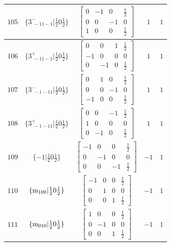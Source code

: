 \documentclass[fleqn,8pt]{jsarticle}
\begin{document}
\begin{longtable}{ccccc}
$ 105 $ & $ \{3^{-}_{\,\,-11-1}|\frac{1}{2} 0 \frac{1}{2}\} $ & $ \begin{bmatrix} 0 & -1 & 0 & \frac{1}{2} \\ 0 & 0 & -1 & 0 \\ 1 & 0 & 0 & \frac{1}{2} \end{bmatrix} $ & $ 1 $ & $ 1 $ \\ \hline
$ 106 $ & $ \{3^{+}_{\,\,-11-1}|\frac{1}{2} 0 \frac{1}{2}\} $ & $ \begin{bmatrix} 0 & 0 & 1 & \frac{1}{2} \\ -1 & 0 & 0 & 0 \\ 0 & -1 & 0 & \frac{1}{2} \end{bmatrix} $ & $ 1 $ & $ 1 $ \\ \hline
$ 107 $ & $ \{3^{-}_{\,\,-1-11}|\frac{1}{2} 0 \frac{1}{2}\} $ & $ \begin{bmatrix} 0 & 1 & 0 & \frac{1}{2} \\ 0 & 0 & -1 & 0 \\ -1 & 0 & 0 & \frac{1}{2} \end{bmatrix} $ & $ 1 $ & $ 1 $ \\ \hline
$ 108 $ & $ \{3^{+}_{\,\,-1-11}|\frac{1}{2} 0 \frac{1}{2}\} $ & $ \begin{bmatrix} 0 & 0 & -1 & \frac{1}{2} \\ 1 & 0 & 0 & 0 \\ 0 & -1 & 0 & \frac{1}{2} \end{bmatrix} $ & $ 1 $ & $ 1 $ \\ \hline
$ 109 $ & $ \{-1|\frac{1}{2} 0 \frac{1}{2}\} $ & $ \begin{bmatrix} -1 & 0 & 0 & \frac{1}{2} \\ 0 & -1 & 0 & 0 \\ 0 & 0 & -1 & \frac{1}{2} \end{bmatrix} $ & $ -1 $ & $ 1 $ \\ \hline
$ 110 $ & $ \{{\rm m}_{100}|\frac{1}{2} 0 \frac{1}{2}\} $ & $ \begin{bmatrix} -1 & 0 & 0 & \frac{1}{2} \\ 0 & 1 & 0 & 0 \\ 0 & 0 & 1 & \frac{1}{2} \end{bmatrix} $ & $ -1 $ & $ 1 $ \\ \hline
$ 111 $ & $ \{{\rm m}_{010}|\frac{1}{2} 0 \frac{1}{2}\} $ & $ \begin{bmatrix} 1 & 0 & 0 & \frac{1}{2} \\ 0 & -1 & 0 & 0 \\ 0 & 0 & 1 & \frac{1}{2} \end{bmatrix} $ & $ -1 $ & $ 1 $ \\ \hline

\end{longtable}
\end{document}
